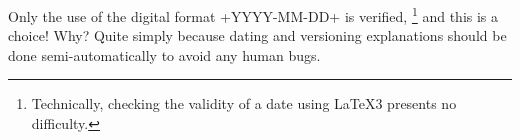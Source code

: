 \documentclass{tutodoc}
\begin{document}
\begin{tdoccaut}
    Only the use of the digital format \tdoclatexin+YYYY-MM-DD+ is verified,%
    \footnote{
        Technically, checking the validity of a date using \LaTeX3 presents no difficulty.
    }
    and this is a choice! Why? Quite simply because dating and versioning explanations should be done semi-automatically to avoid any human bugs.
\end{tdoccaut}
\end{document}
